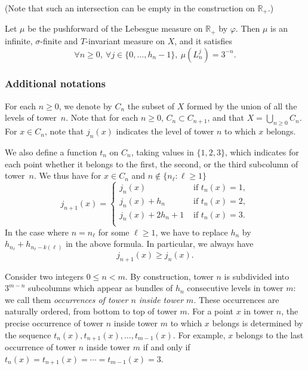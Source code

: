 \documentclass[AHL,Unicode,longabstracts]{cedram}
\newcommand{\RR}{\mathbb{R}}
\let\oldforall\forall
\renewcommand*{\forall}{\mathrel{\oldforall}}
\begin{document}
(Note that such an intersection can be empty in the construction on $\RR_+$.)

Let $\mu$ be the pushforward of the Lebesgue measure on $\RR_+$ by $\varphi$. Then $\mu$ is an infinite, $\sigma$-finite and $T$-invariant measure on $X$, and it satisfies
\[
\forall n\ge0,\ \forall j\in\{0,\ldots,h_n-1\},\ \mu(L_n^j)=3^{-n}.
\]

\subsubsection*{Additional notations}

For each $n\ge0$, we denote by $C_n$ the subset of $X$ formed by the union of all the levels of tower~$n$. Note that for each $n\ge0$, $C_n\subset C_{n+1}$, and that $X=\bigcup_{n\ge0}C_n$. For $x\in C_n$, note that $j_n(x)$ indicates the level of tower $n$ to which $x$ belongs.

We also define a function $t_n$ on $C_n$, taking values in $\{1,2,3\}$, which indicates for each point whether it belongs to the first, the second, or the third subcolumn of tower~$n$. We thus have for $x\in C_n$ and $n\notin\{n_\ell:\ell\ge1\}$
\begin{equation}\label{eq:induction_for_j_n}
j_{n+1}(x) =
\begin{cases}
j_n(x) & \text{ if }t_n(x)=1,\\
j_n(x)+h_n & \text{ if }t_n(x)=2,\\
j_n(x)+2h_n+1 & \text{ if }t_n(x)=3.\\
\end{cases}
\end{equation}
In the case where $n=n_\ell$ for some $\ell\ge1$, we have to replace $h_n$ by $h_{n_\ell}+h_{n_\ell-k(\ell)}$ in the above formula. In particular, we always have
\begin{equation}\label{eq:s_n}
j_{n+1}(x) \ge j_n(x).
\end{equation}

Consider two integers $0\le n < m$. By construction, tower $n$ is subdivided into $3^{m-n}$ subcolumns which appear as bundles of $h_n$ consecutive levels in tower $m$: we call them \emph{occurrences of tower $n$ inside tower $m$}. These occurrences are naturally ordered, from bottom to top of tower $m$. For a point $x$ in tower $n$, the precise occurrence of tower $n$ inside tower $m$ to which $x$ belongs is determined by the sequence $t_n(x),t_{n+1}(x),\ldots,t_{m-1}(x)$. For example, $x$ belongs to the last occurrence of tower $n$ inside tower $m$ if and only if $t_n(x)=t_{n+1}(x)=\cdots=t_{m-1}(x)=3$.
\end{document}
